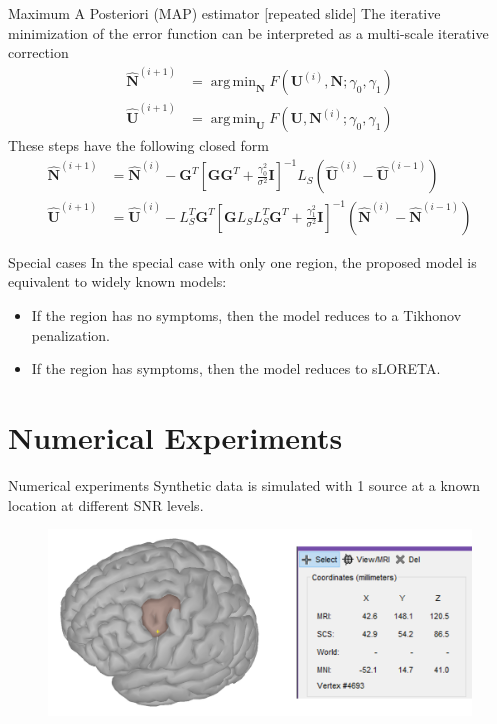 \documentclass[progressbar=head]{beamer}
\newcommand{\ppar}[1]{ \left( #1 \right) }
\newcommand{\spar}[1]{ \left[ #1 \right] }
\DeclareMathOperator*{\argmin}{arg\,min}
\newcommand{\G}{\mathbf{G}}
\newcommand{\U}{\mathbf{U}}
\newcommand{\N}{\mathbf{N}}
\newcommand{\id}{\mathbf{I}}
\begin{document}
\begin{frame}{Maximum A Posteriori (MAP) estimator [repeated slide]}
    The iterative minimization of the error function can be interpreted as a multi-scale iterative correction
    \begin{align}
        \hat{\N}^{(i+1)} &= \argmin_{\N} F\ppar{\U^{(i)},\N; \gamma_0, \gamma_1}
        \\
        \hat{\U}^{(i+1)} &= \argmin_{\U} F\ppar{\U,\N^{(i)}; \gamma_0, \gamma_1}
    \end{align}
    These steps have the following closed form
    \begin{align}
        \hat{\N}^{(i+1)} &=
        \hat{\N}^{(i)}
        -
        \G^T \spar{\G \G^T + \frac{\gamma_0^2}{\sigma^2} \id}^{-1} L_S \ppar{\hat{\U}^{(i)}-\hat{\U}^{(i-1)} }
        \\
        \hat{\U}^{(i+1)} &=
        \hat{\U}^{(i)}
        -
        L_S^T \G^T \spar{\G L_S L_S^T \G^T + \frac{\gamma_1^2}{\sigma^2} \id}^{-1} \ppar{\hat{\N}^{(i)}-\hat{\N}^{(i-1)} }
    \end{align}
\end{frame}

\begin{frame}{Special cases}
In the special case with only one region, the proposed model is equivalent to widely known models:
\begin{itemize}
\item If the region has no symptoms, 
then the model reduces to a Tikhonov penalization.
\item If the region has symptoms,
then the model reduces to sLORETA.
\end{itemize}
\end{frame}


{
\section{Numerical Experiments}
}

\begin{frame}{Numerical experiments}
Synthetic data is simulated with 1 source at a known location at different SNR levels. 
\begin{figure}
\centering
\includegraphics[width=0.8\linewidth]{./img_oldbeamer/protocol1}
\end{figure}
\end{frame}
\end{document}
